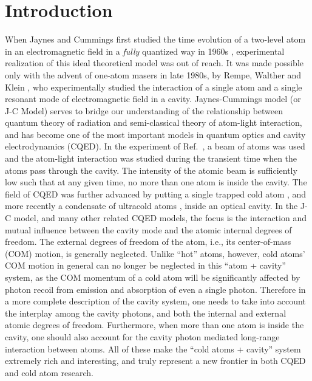 \documentclass[atoms,article,submit,moreauthors,pdftex,12pt,a4paper]{mdpi}
\begin{document}

\section{Introduction}

When Jaynes and Cummings first studied the time evolution of a two-level atom in an electromagnetic field in a {\em fully} quantized way in 1960s \cite{JCM}, experimental realization of this ideal theoretical model was out of reach. It was made possible only with the advent of one-atom masers in late 1980s, by Rempe, Walther and Klein \cite{exp1987}, who experimentally studied the interaction of a single atom and a single resonant mode of electromagnetic field in a cavity. Jaynes-Cummings model (or J-C Model) serves to bridge our understanding of the relationship between quantum theory of radiation and semi-classical theory of atom-light interaction, and has become one of the most important models in quantum optics and cavity electrodynamics (CQED). 
In the experiment of Ref.~\cite{exp1987}, a beam of atoms was used and the atom-light interaction was studied during the transient time when the atoms pass through the cavity. The intensity of the atomic beam is sufficiently low such that at any given time, no more than one atom is inside the cavity.
The field of CQED was further advanced by putting a single trapped cold atom \cite{cavity0}, and more recently a condensate of ultracold atoms \cite{cavity1, cavity2, cavity3,Esslinger2010}, inside an optical cavity. In the J-C model, and many other related CQED models, the focus is the interaction and mutual influence between the cavity mode and the atomic internal degrees of freedom. The external degrees of freedom of the atom, i.e., its center-of-mass (COM) motion, is generally neglected. Unlike ``hot'' atoms, however, cold atoms' COM motion in general can no longer be neglected in this ``atom + cavity'' system, as the COM momentum of a cold atom will be significantly affected by photon recoil from emission and absorption of even a single photon. Therefore in a more complete description of the cavity system, one needs to take into account the interplay among the cavity photons, and both the internal and external atomic degrees of freedom. Furthermore, when more than one atom is inside the cavity, one should also account for the cavity photon mediated long-range interaction between atoms. All of these make the ``cold atoms + cavity'' system extremely rich and interesting, and truly represent a new frontier in both CQED and cold atom research. 
\end{document}
